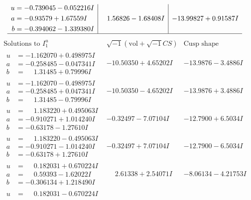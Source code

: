 \documentclass[1p]{elsarticle_modified}
\theoremstyle{definition}
\newcommand{\I}{\sqrt{-1}}
\begin{document}
$$\begin{array}{c|c|c}
\begin{aligned}
u &= -0.739045 - 0.052216 I \\
a &= -0.93579 + 1.67559 I \\
b &= -0.394062 - 1.339380 I\end{aligned}
 & \phantom{-}1.56826 - 1.68408 I & -13.99827 + 0.91587 I\\
 \hline 
 \end{array}$$\newpage$$\begin{array}{c|c|c}  
\text{Solutions to }I^u_{1}& \I (\text{vol} + \sqrt{-1}CS) & \text{Cusp shape}\\
 \hline 
\begin{aligned}
u &= -1.162070 + 0.498975 I \\
a &= -0.258485 - 0.047341 I \\
b &= \phantom{-}1.31485 + 0.79996 I\end{aligned}
 & -10.50350 + 4.65202 I & -13.9876 - 3.4886 I \\ \hline\begin{aligned}
u &= -1.162070 - 0.498975 I \\
a &= -0.258485 + 0.047341 I \\
b &= \phantom{-}1.31485 - 0.79996 I\end{aligned}
 & -10.50350 - 4.65202 I & -13.9876 + 3.4886 I \\ \hline\begin{aligned}
u &= \phantom{-}1.183220 + 0.495063 I \\
a &= -0.910271 + 1.014240 I \\
b &= -0.63178 - 1.27610 I\end{aligned}
 & -0.32497 - 7.07104 I & -12.7900 + 6.5034 I \\ \hline\begin{aligned}
u &= \phantom{-}1.183220 - 0.495063 I \\
a &= -0.910271 - 1.014240 I \\
b &= -0.63178 + 1.27610 I\end{aligned}
 & -0.32497 + 7.07104 I & -12.7900 - 6.5034 I \\ \hline\begin{aligned}
u &= \phantom{-}0.182031 + 0.670224 I \\
a &= \phantom{-}0.59393 - 1.62022 I \\
b &= -0.306134 + 1.218490 I\end{aligned}
 & \phantom{-}2.61338 + 2.54071 I & -8.06134 - 4.21753 I \\ \hline\begin{aligned}
u &= \phantom{-}0.182031 - 0.670224 I \\

\end{aligned}
\end{array}$$
\end{document}
